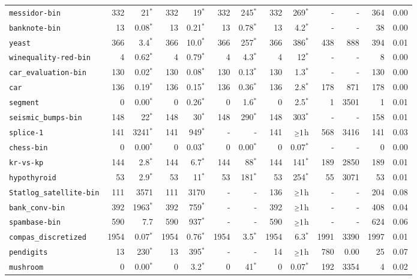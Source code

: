 \begin{tabular}{lrrrrrrrrrrrr}
\texttt{messidor-bin} & 332 & 21$^*$ & 332 & 19$^*$ & 332 & 245$^*$ & 332 & 269$^*$ & - & - & 364 & 0.00\\
\texttt{banknote-bin} & 13 & 0.08$^*$ & 13 & 0.21$^*$ & 13 & 0.78$^*$ & 13 & 4.2$^*$ & - & - & 38 & 0.00\\
\texttt{yeast} & 366 & 3.4$^*$ & 366 & 10.0$^*$ & 366 & 257$^*$ & 366 & 386$^*$ & 438 & 888 & 394 & 0.01\\
\texttt{winequality-red-bin} & 4 & 0.62$^*$ & 4 & 0.79$^*$ & 4 & 4.3$^*$ & 4 & 12$^*$ & - & - & 8 & 0.00\\
\texttt{car\_evaluation-bin} & 130 & 0.02$^*$ & 130 & 0.08$^*$ & 130 & 0.13$^*$ & 130 & 1.3$^*$ & - & - & 130 & 0.00\\
\texttt{car} & 136 & 0.19$^*$ & 136 & 0.15$^*$ & 136 & 0.36$^*$ & 136 & 2.8$^*$ & 178 & 871 & 178 & 0.00\\
\texttt{segment} & 0 & 0.00$^*$ & 0 & 0.26$^*$ & 0 & 1.6$^*$ & 0 & 2.5$^*$ & 1 & 3501 & 1 & 0.01\\
\texttt{seismic\_bumps-bin} & 148 & 22$^*$ & 148 & 30$^*$ & 148 & 290$^*$ & 148 & 303$^*$ & - & - & 158 & 0.01\\
\texttt{splice-1} & 141 & 3241$^*$ & 141 & 949$^*$ & - & - & 141 & $\mathsmaller{\geq}1$h & 568 & 3416 & 141 & 0.03\\
\texttt{chess-bin} & 0 & 0.00$^*$ & 0 & 0.03$^*$ & 0 & 0.00$^*$ & 0 & 0.07$^*$ & - & - & 0 & 0.00\\
\texttt{kr-vs-kp} & 144 & 2.8$^*$ & 144 & 6.7$^*$ & 144 & 88$^*$ & 144 & 141$^*$ & 189 & 2850 & 189 & 0.01\\
\texttt{hypothyroid} & 53 & 2.9$^*$ & 53 & 11$^*$ & 53 & 181$^*$ & 53 & 254$^*$ & 55 & 3071 & 53 & 0.01\\
\texttt{Statlog\_satellite-bin} & 111 & 3571 & 111 & 3170 & - & - & 136 & $\mathsmaller{\geq}1$h & - & - & 204 & 0.08\\
\texttt{bank\_conv-bin} & 392 & 1963$^*$ & 392 & 759$^*$ & - & - & 392 & $\mathsmaller{\geq}1$h & - & - & 408 & 0.04\\
\texttt{spambase-bin} & 590 & 7.7 & 590 & 937$^*$ & - & - & 590 & $\mathsmaller{\geq}1$h & - & - & 624 & 0.06\\
\texttt{compas\_discretized} & 1954 & 0.07$^*$ & 1954 & 0.76$^*$ & 1954 & 3.5$^*$ & 1954 & 6.3$^*$ & 1991 & 3390 & 1997 & 0.01\\
\texttt{pendigits} & 13 & 230$^*$ & 13 & 395$^*$ & - & - & 14 & $\mathsmaller{\geq}1$h & 780 & 0.00 & 25 & 0.07\\
\texttt{mushroom} & 0 & 0.00$^*$ & 0 & 3.2$^*$ & 0 & 41$^*$ & 0 & 0.07$^*$ & 192 & 3354 & 4 & 0.02\\

\end{tabular}
